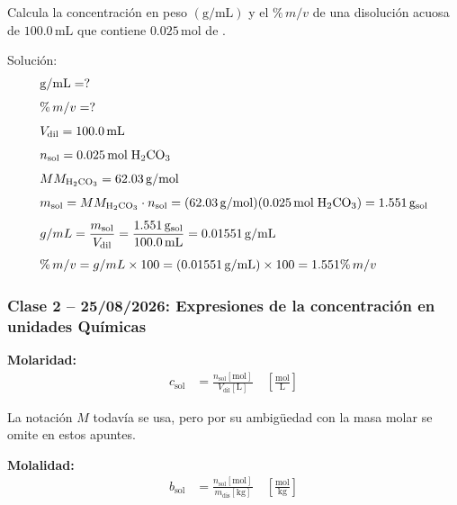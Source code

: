 \begin{exercise}{}{}
Calcula la concentración en peso $(\mathrm{g/mL})$ y el $\%\,m/v$ de una disolución acuosa de $100.0\,\mathrm{mL}$ que contiene $0.025\,\mathrm{mol}$ de .

Solución:
\begin{align*}
    &\mathrm{g/mL} = ? \\[4pt]
    &\%\,m/v = ? \\[4pt]
    &V_{\mathrm{dil}} = 100.0\,\mathrm{mL} \\[4pt]
    &n_{\mathrm{sol}} = 0.025\,\mathrm{mol}\;\ce{H2CO3} \\[4pt]
    &MM_{\mathrm{H_2CO_3}} = 62.03\,\mathrm{g/mol} \\[4pt]
    &m_{\mathrm{sol}} = MM_{\mathrm{H_2CO_3}} \cdot n_{\mathrm{sol}}
        = (62.03\,\mathrm{g/mol})(0.025\,\mathrm{mol}\;\ce{H2CO3})
        = 1.551\,\mathrm{g}_{\mathrm{sol}} \\[4pt]
    &g/mL = \frac{m_{\mathrm{sol}}}{V_{\mathrm{dil}}}
        = \frac{1.551\,\mathrm{g}_{\mathrm{sol}}}{100.0\,\mathrm{mL}}
        = 0.01551\,\mathrm{g/mL} \\[4pt]
    &\%\,m/v = g/mL \times 100
        = (0.01551\,\mathrm{g/mL}) \times 100
        = 1.551\%\,m/v
\end{align*}
\end{exercise}

{}
\subsubsection*{\textcolor{blueunam}{Clase 2 -- 25/08/2026: Expresiones de la concentración en unidades Químicas}}

\textbf{Molaridad:}
\begin{align*}
    c_{\mathrm{sol}} &= \frac{n_{\mathrm{sol}}[\mathrm{mol}]}{V_{\mathrm{dil}}[\mathrm{L}]}
    \quad \left[\frac{\mathrm{mol}}{\mathrm{L}}\right]
\end{align*}

\begin{notafija}
La notación \(M\) todavía se usa, pero por su ambigüedad con la masa molar se 
omite en estos apuntes.
\end{notafija}

\textbf{Molalidad:}
\begin{align*}
    b_{\mathrm{sol}} &= \frac{n_{\mathrm{sol}}[\mathrm{mol}]}{m_{\mathrm{dis}}[\mathrm{kg}]}
    \quad \left[\frac{\mathrm{mol}}{\mathrm{kg}}\right]
\end{align*}

